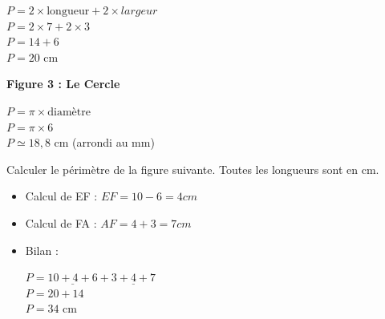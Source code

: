 \documentclass[a4paper]{book}
\begin{document}
{\begin{exercice}
\begin{minipage}{0.33\linewidth}
            \medskip
            \raggedright
            
            $P=2\times\text{longueur}+2\times{largeur}$\\
            $P=2\times7+2\times3$\\
            $P=14+6$\\
            $P=20$  cm
        \end{minipage}        
        \hfill\vline\hfill
        \begin{minipage}{0.33\linewidth}
            \centering
            \textbf{Figure 3 : Le Cercle} \\
            \vspace{0.3cm}
            
            \medskip
            \raggedright
            
            $P=\pi\times\text{diamètre}$\\
            $P=\pi\times6$\\
            $P\simeq18,8$ cm (arrondi au mm)
        \end{minipage}
    \end{exercice}


    \begin{exercice}
        Calculer le périmètre de la figure suivante. Toutes les longueurs sont en cm.

        \medskip

        \begin{minipage}{0.5\linewidth}
            \begin{itemize}
                \item Calcul de EF : $EF=10-6=4cm$

                \item Calcul de FA : $AF=4+3=7 cm$

                \item Bilan : 

                $P=\underline{10+4+6}+\underline{3+4+7}$\\
                $P=20+14$\\
                $P=34$ cm
            \end{itemize}
            

\end{minipage}
\end{exercice}}
\end{document}
